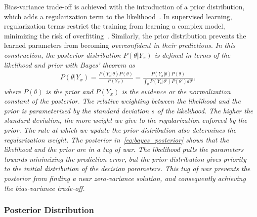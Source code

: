 %
Bias-variance trade-off is achieved with the introduction of a prior
distribution, which adds a regularization term to the
likelihood~\cite{bishop2006pattern}.
%
In supervised learning, regularization terms restrict the training from learning
a complex model, minimizing the risk of overfitting~\cite{santos2022avoiding}.
%
Similarly, the prior distribution prevents the learned parameters from becoming
\it{overconfident} \normalfont in their predictions.
%
In this construction, the posterior distribution $P(\theta | Y_x)$ is
defined in terms of the likelihood and prior with Bayes' theorem as 
\begin{align}
  P(\theta | Y_x) = \frac{P(Y_x | \theta) P(\theta) }{P(Y_x)}
  = \frac{P(Y_x | \theta) P(\theta) }{\int_\theta P(Y_x | \theta') P(\theta')  d\theta'}, 
  \label{eq:bayes_posterior}
\end{align}
where  $P(\theta)$ is the prior and $P(Y_x)$ is the evidence or the
normalization constant of the posterior.
%
The relative weighting between the likelihood and the prior is parameterized by
the standard deviation $s$ of the likelihood. The higher the standard deviation,
the more weight we give to the regularization enforced by the prior.
%
The rate at which we update the prior distribution also determines the
regularization weight.
%
The posterior in~\eqref{eq:bayes_posterior} shows that the likelihood and the
prior are in a tug of war. The likelihood pulls the parameters towards
minimizing the prediction error, but the prior distribution gives priority to the
initial distribution of the decision parameters.
%
This tug of war prevents the posterior from finding a near zero-variance
solution, and consequently achieving the bias-variance trade-off.

\subsubsection{Posterior Distribution}

